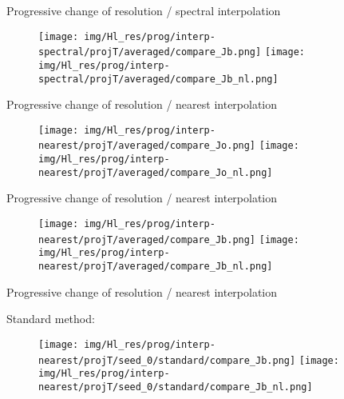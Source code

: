 \documentclass[francais]{beamer}
\begin{document}
\begin{frame}{Progressive change of resolution / spectral interpolation}
\begin{center}
\begin{figure}
  \texttt{[image: img/Hl\_res/prog/interp-spectral/projT/averaged/compare\_Jb.png]}
\endminipage\hfill
{}
  \texttt{[image: img/Hl\_res/prog/interp-spectral/projT/averaged/compare\_Jb\_nl.png]}
\endminipage
\end{figure}
\end{center}
\end{frame}
\begin{frame}{Progressive change of resolution / nearest interpolation}
\begin{center}
\begin{figure}
  \texttt{[image: img/Hl\_res/prog/interp-nearest/projT/averaged/compare\_Jo.png]}
\endminipage\hfill
{}
  \texttt{[image: img/Hl\_res/prog/interp-nearest/projT/averaged/compare\_Jo\_nl.png]}
\endminipage
\end{figure}
\end{center}
\end{frame}

\begin{frame}{Progressive change of resolution / nearest interpolation}
\begin{center}
\begin{figure}
  \texttt{[image: img/Hl\_res/prog/interp-nearest/projT/averaged/compare\_Jb.png]}
\endminipage\hfill
{}
  \texttt{[image: img/Hl\_res/prog/interp-nearest/projT/averaged/compare\_Jb\_nl.png]}
\endminipage
\end{figure}
\end{center}
\end{frame}

\begin{frame}{Progressive change of resolution / nearest interpolation}
\begin{center}
Standard method:
\begin{figure}
  \texttt{[image: img/Hl\_res/prog/interp-nearest/projT/seed\_0/standard/compare\_Jb.png]}
\endminipage\hfill
{}
  \texttt{[image: img/Hl\_res/prog/interp-nearest/projT/seed\_0/standard/compare\_Jb\_nl.png]}
\endminipage
\end{figure}
\end{center}
\end{frame}
\end{document}
